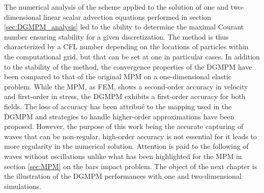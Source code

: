 The numerical analysis of the scheme applied to the solution of one and two-dimensional linear scalar advection equations performed in section \ref{sec:DGMPM_analysis} led to the ability to determine the maximal Courant number ensuring stability for a given discretization. The method is thus characterized by a CFL number depending on the locations of particles within the computational grid, but that can be set at one in particular cases. In addition to the stability of the method, the convergence properties of the DGMPM have been compared to that of the original MPM on a one-dimensional elastic problem. While the MPM, as FEM, shows a second-order accuracy in velocity and first-order in stress, the DGMPM exhibits a first-order accuracy for both fields. The loss of accuracy has been attribué to the mapping used in the DGMPM and strategies to handle higher-order approximations have been proposed. However, the purpose of this work being the accurate capturing of waves that can be non-regular, high-order accuracy is not essential for it leads to more regularity in the numerical solution. Attention is paid to the following of waves without oscillations unlike what has been highlighted for the MPM in section \ref{sec:MPM} on the bars impact problem. The object of the next chapter is the illustration of the DGMPM performances with one and two-dimensional simulations.




